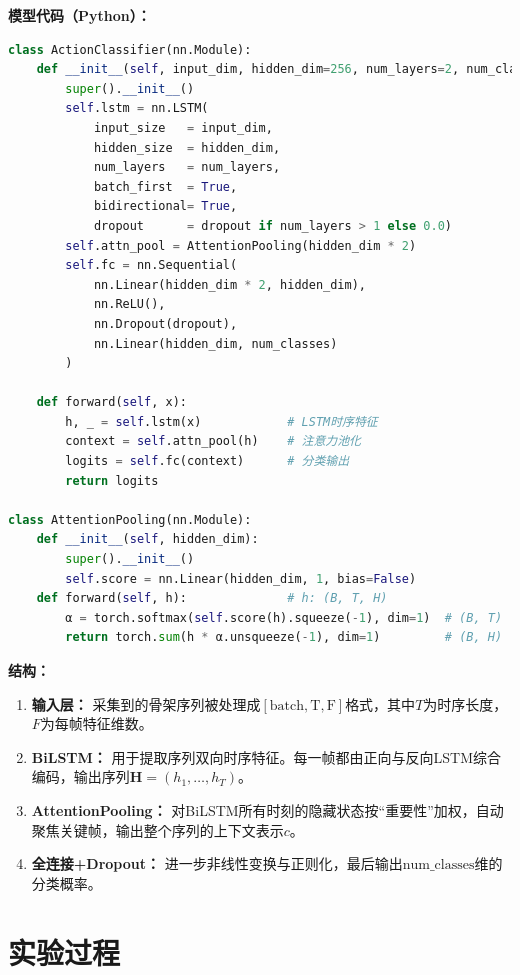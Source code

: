 \documentclass[UTF8]{article}
\begin{document}
\vspace{0.5em}
\noindent
\textbf{模型代码（Python）：}
\begin{lstlisting}[language=Python, caption={BiLSTM+Attention模型主结构}]
class ActionClassifier(nn.Module):
    def __init__(self, input_dim, hidden_dim=256, num_layers=2, num_classes=8, dropout=0.3):
        super().__init__()
        self.lstm = nn.LSTM(
            input_size   = input_dim,
            hidden_size  = hidden_dim,
            num_layers   = num_layers,
            batch_first  = True,
            bidirectional= True,
            dropout      = dropout if num_layers > 1 else 0.0)
        self.attn_pool = AttentionPooling(hidden_dim * 2)
        self.fc = nn.Sequential(
            nn.Linear(hidden_dim * 2, hidden_dim),
            nn.ReLU(),
            nn.Dropout(dropout),
            nn.Linear(hidden_dim, num_classes)
        )

    def forward(self, x):
        h, _ = self.lstm(x)            # LSTM时序特征
        context = self.attn_pool(h)    # 注意力池化
        logits = self.fc(context)      # 分类输出
        return logits

class AttentionPooling(nn.Module):
    def __init__(self, hidden_dim):
        super().__init__()
        self.score = nn.Linear(hidden_dim, 1, bias=False)
    def forward(self, h):              # h: (B, T, H)
        α = torch.softmax(self.score(h).squeeze(-1), dim=1)  # (B, T)
        return torch.sum(h * α.unsqueeze(-1), dim=1)         # (B, H)
\end{lstlisting}

\vspace{0.5em}
\noindent
\textbf{结构：}
\begin{enumerate}
    \item \textbf{输入层：} 采集到的骨架序列被处理成$\mathrm{[batch, T, F]}$格式，其中$T$为时序长度，$F$为每帧特征维数。
    \item \textbf{BiLSTM：} 用于提取序列双向时序特征。每一帧都由正向与反向LSTM综合编码，输出序列$\mathbf{H}=(h_1,\dots,h_T)$。
    \item \textbf{AttentionPooling：} 对BiLSTM所有时刻的隐藏状态按“重要性”加权，自动聚焦关键帧，输出整个序列的上下文表示$c$。
    \item \textbf{全连接+Dropout：} 进一步非线性变换与正则化，最后输出$\mathrm{num\_classes}$维的分类概率。
\end{enumerate}

\section{实验过程}
\end{document}
